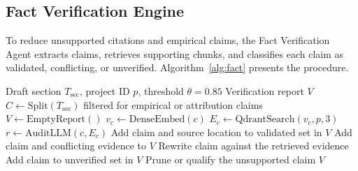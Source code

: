 \documentclass[conference]{IEEEtran}
\begin{document}
\subsection{Fact Verification Engine}
To reduce unsupported citations and empirical claims, the Fact Verification Agent extracts claims, retrieves supporting chunks, and classifies each claim as validated, conflicting, or unverified. Algorithm~\ref{alg:fact} presents the procedure.
\begin{algorithm}[!t]
\caption{Real-Time Claim Extraction and Multi-Hop Grounding}
\label{alg:fact}
\begin{algorithmic}[1]
\Require Draft section $T_{\mathrm{sec}}$, project ID $p$, threshold $\theta=0.85$
\Ensure Verification report $V$
\State $C\gets\mathrm{Split}(T_{\mathrm{sec}})$ filtered for empirical or attribution claims
\State $V\gets\mathrm{EmptyReport}()$
\State $v_c\gets\mathrm{DenseEmbed}(c)$
\State $E_c\gets\mathrm{QdrantSearch}(v_c,p,3)$
\State $r\gets\mathrm{AuditLLM}(c,E_c)$
\State Add claim and source location to validated set in $V$
\State Add claim and conflicting evidence to $V$
\State Rewrite claim against the retrieved evidence
\Else
\State Add claim to unverified set in $V$
\State Prune or qualify the unsupported claim
\EndIf
\EndFor
\State \Return $V$
\end{algorithmic}
\end{algorithm}
\end{document}
